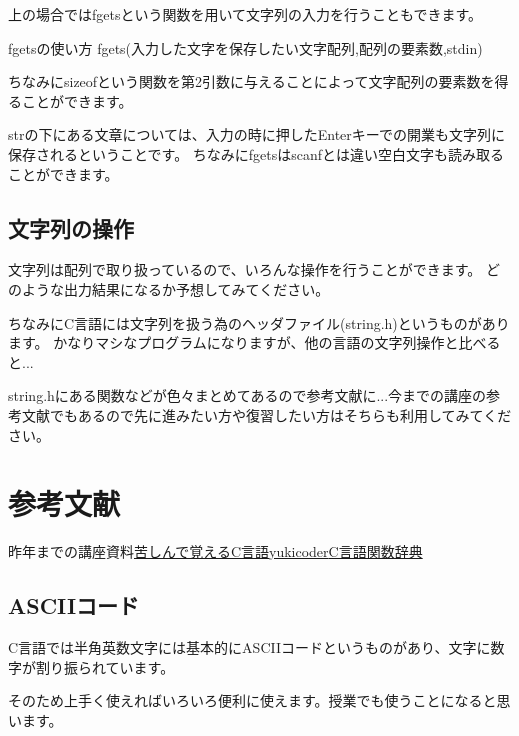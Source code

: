 

上の場合ではfgetsという関数を用いて文字列の入力を行うこともできます。

\begin{itembox}{fgetsの使い方}
fgets(入力した文字を保存したい文字配列,配列の要素数,stdin)
\end{itembox}

ちなみにsizeofという関数を第2引数に与えることによって文字配列の要素数を得ることができます。


strの下にある文章については、入力の時に押したEnterキーでの開業も文字列に保存されるということです。
ちなみにfgetsはscanfとは違い空白文字も読み取ることができます。

\subsection{文字列の操作}
文字列は配列で取り扱っているので、いろんな操作を行うことができます。
どのような出力結果になるか予想してみてください。

ちなみにC言語には文字列を扱う為のヘッダファイル(string.h)というものがあります。
かなりマシなプログラムになりますが、他の言語の文字列操作と比べると...


string.hにある関数などが色々まとめてあるので参考文献に...今までの講座の参考文献でもあるので先に進みたい方や復習したい方はそちらも利用してみてください。

\section*{参考文献}
\noindent
[1]昨年までの講座資料\newline
[2]\href{http://9cguide.appspot.com}{苦しんで覚えるC言語}\newline
[3]\href{https://yukicoder.me/}{yukicoder}\newline
[4]\href{http://www.c-tipsref.com/reference/string.html}{C言語関数辞典}

\subsection{ASCIIコード}
C言語では半角英数文字には基本的にASCIIコードというものがあり、文字に数字が割り振られています。

そのため上手く使えればいろいろ便利に使えます。授業でも使うことになると思います。



